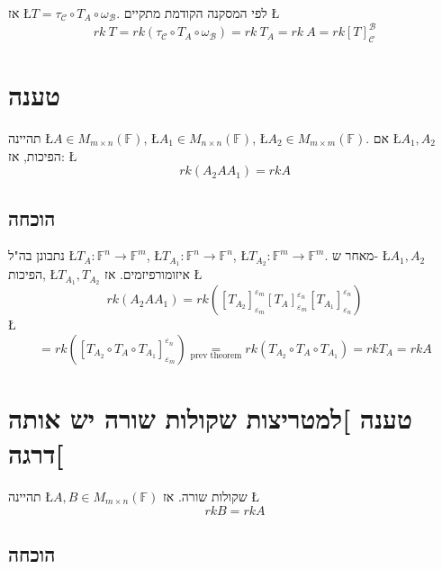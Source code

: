 \documentclass[english,hebrew]{article}
\begin{document}
אז \L{$T=\tau_{\mathcal{C}}\circ T_{A}\circ\omega_{\mathcal{B}}$}.
לפי המסקנה הקודמת מתקיים \L{%
\[
rk\ T=rk(\tau_{\mathcal{C}}\circ T_{A}\circ\omega_{\mathcal{B}})=rk\ T_{A}=rk\ A=rk[T]_{\mathcal{C}}^{\mathcal{B}}
\]
}%

\noindent{}

\section{טענה}

תהיינה \L{$A\in M_{m\times n}(\mathbb{F})$}, \L{$A_{1}\in M_{n\times n}(\mathbb{F})$},
\L{$A_{2}\in M_{m\times m}(\mathbb{F})$}. אם \L{$A_{1},A_{2}$} הפיכות,
אז: \L{%
\[
rk(A_{2}AA_{1})=rkA
\]
}%

\subsection{הוכחה}

נתבונן בה"ל \L{$T_{A}:\mathbb{F}^{n}\to\mathbb{F}^{m}$}, \L{$T_{A_{1}}:\mathbb{F}^{n}\to\mathbb{F}^{n}$},
\L{$T_{A_{2}}:\mathbb{F}^{m}\to\mathbb{F}^{m}$}. מאחר ש- \L{$A_{1},A_{2}$}
הפיכות, \L{$T_{A_{1}},T_{A_{2}}$} איזומורפיזמים. אז \L{%
\[
rk(A_{2}AA_{1})=rk([T_{A_{2}}]_{\varepsilon_{m}}^{\varepsilon_{m}}[T_{A}]_{\varepsilon_{m}}^{\varepsilon_{n}}[T_{A_{1}}]_{\varepsilon_{n}}^{\varepsilon_{n}})
\]
}%
\L{%
\[
=rk([T_{A_{2}}\circ T_{A}\circ T_{A_{1}}]_{\varepsilon_{m}}^{\varepsilon_{n}})\underset{\text{prev theorem}}{=}rk(T_{A_{2}}\circ T_{A}\circ T_{A_{1}})=rkT_{A}=rkA
\]
}%

\section{טענה {]}למטריצות שקולות שורה יש אותה דרגה{[}}

תהיינה \L{$A,B\in M_{m\times n}(\mathbb{F})$} שקולות שורה. אז \L{%
\[
rkB=rkA
\]
}%

\subsection{הוכחה}
\end{document}
